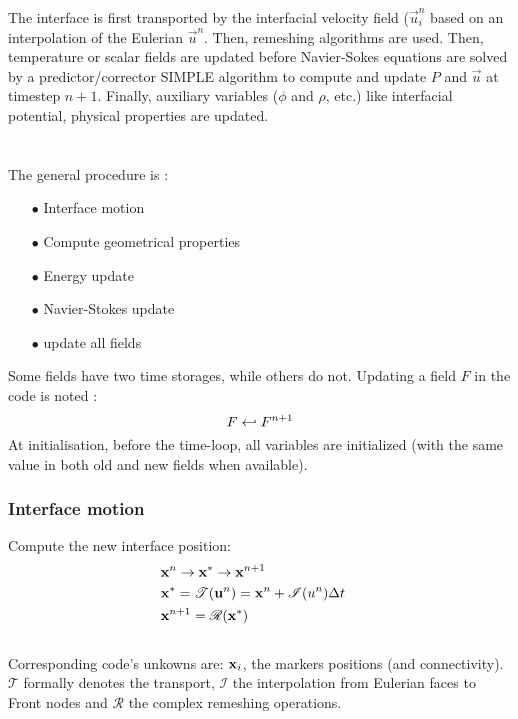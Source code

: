 \documentclass[]{article}
\begin{document}
The interface is first transported by the interfacial velocity field ($\vec{u}_i^{n}$ based on an interpolation of the Eulerian $\vec{u}^n$. Then, 
remeshing algorithms are used.
Then, temperature or scalar fields are updated before Navier-Sokes equations are solved by a predictor/corrector SIMPLE algorithm to compute and update $P$ and $\vec{u}$ at timestep $n+1$. Finally, auxiliary variables 
($\phi$ and $\rho$, etc.) like interfacial potential, physical properties are updated. 
% 
~\\\\
\\
The general procedure is : 
\begin{itemize}
	\item[$\bullet$] Interface motion
	\item[$\bullet$] Compute geometrical properties
	\item[$\bullet$] Energy update
	\item[$\bullet$] Navier-Stokes update
	\item[$\bullet$] update all fields
\end{itemize}
Some fields have two time storages, while others do not. 
Updating a field $F$ in the code is noted : 
\begin{equation}
	F\into F^{n+1}  \code{  --> turn_the_wheel() or old_to_new() or affectation;}
\end{equation}
At initialisation, before the time-loop, all variables are initialized (with the same value in both old and new fields when available).

\subsubsection{Interface motion}
Compute the new interface position: 
\begin{align} 
	&\ve{x}^n \to \ve{x}^* \to \ve{x}^{n+1} \\
	&\ve{x}^* = \mathcal{T}(\ve{u}^n) = \ve{x}^n +\mathcal{I}(u^n) \Delta t \quad \code{  --> interfaces_->transporter_maillage();} \\
	&\ve{x}^{n+1} = \mathcal{R}(\ve{x}^*) \quad \code{  --> interfaces_->remailler_interface();}
\end{align}
\\
Corresponding code's unkowns are: $\ve{x}_i$, the markers positions (and connectivity).
$\mathcal{T}$ formally denotes the transport, $\mathcal{I}$ the interpolation from Eulerian faces to Front nodes and $\mathcal{R}$ the complex remeshing operations.
\end{document}
